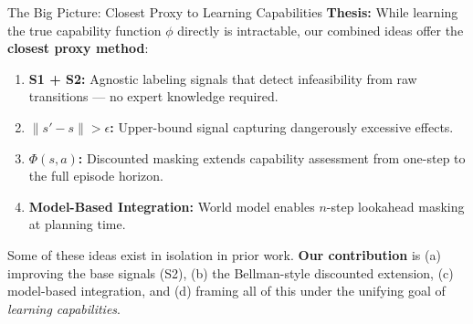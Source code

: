 \documentclass[11pt,aspectratio=169]{beamer}
\begin{document}
\begin{frame}{The Big Picture: Closest Proxy to Learning Capabilities}
    \textbf{Thesis:} While learning the true capability function $\phi$ directly is intractable, our combined ideas offer the \textbf{closest proxy method}:

    \vspace{0.3cm}
    \begin{enumerate}
        \item \textbf{S1 + S2:} Agnostic labeling signals that detect infeasibility from raw transitions — no expert knowledge required.
        \item \textbf{$\|s'-s\| > \epsilon$:} Upper-bound signal capturing dangerously excessive effects.
        \item \textbf{$\Phi(s, a)$:} Discounted masking extends capability assessment from one-step to the full episode horizon.
        \item \textbf{Model-Based Integration:} World model enables $n$-step lookahead masking at planning time.
    \end{enumerate}

    \vspace{0.3cm}
    Some of these ideas exist in isolation in prior work. \textbf{Our contribution} is (a) improving the base signals (S2), (b) the Bellman-style discounted extension, (c) model-based integration, and (d) framing all of this under the unifying goal of \textit{learning capabilities}.
\end{frame}
\end{document}
